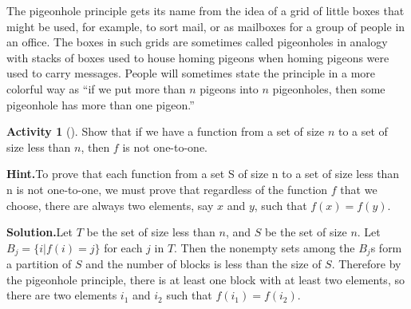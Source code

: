 \documentclass[10pt,]{book}
\theoremstyle{plain}
\theoremstyle{definition}
\newtheorem{activity}[project]{Activity}
\numberwithin{equation}{chapter}
\begin{document}
The pigeonhole principle gets its name from the idea of a grid of little boxes that might be used, for example, to sort mail, or as mailboxes for a group of people in an office. The boxes in such grids are sometimes called pigeonholes in analogy with stacks of boxes used to house homing pigeons when homing pigeons were used to carry messages. People will sometimes state the principle in a more colorful way as ``if we put more than \(n\) pigeons into \(n\) pigeonholes, then some pigeonhole has more than one pigeon.''%
\begin{activity}[]\label{activity-61}
Show that if we have a function from a set of size \(n\) to a set of size less than \(n\), then \(f\) is not one-to-one.%
\par\medskip\noindent%
\textbf{Hint.}\quad To prove that each function from a set S of size n to a set of size less than n is not one-to-one, we must prove that regardless of the function \(f\) that we choose, there are always two elements, say \(x\) and \(y\), such that \(f(x) = f(y)\).%
\par\medskip\noindent%
\textbf{Solution.}\quad Let \(T\) be the set of size less than \(n\), and \(S\) be the set of size \(n\). Let \(B_j=\{i|f(i)=j\}\) for each \(j\) in \(T\). Then the nonempty sets among the \(B_j\)s form a partition of \(S\) and the number of blocks is less than the size of \(S\). Therefore by the pigeonhole principle, there is at least one block with at least two elements, so there are two elements \(i_1\) and \(i_2\) such that \(f(i_1)=f(i_2)\).%
\end{activity}
\end{document}
